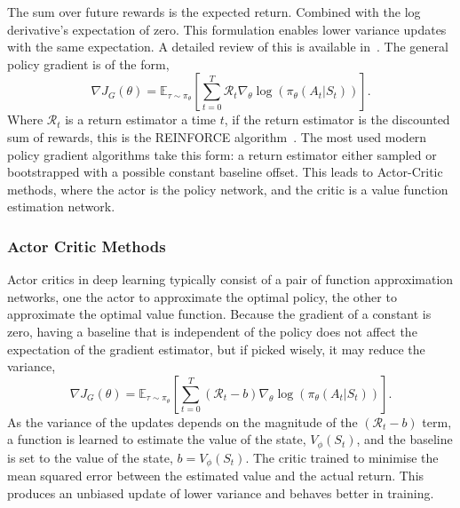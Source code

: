 The sum over future rewards is the expected return. Combined with the log derivative's expectation of zero. This formulation enables lower variance updates with the same expectation. A detailed review of this is available in~\cite{schulman2015highdimensional}. The general policy gradient is of the form,
\begin{equation}
	\nabla J_G(\theta)  = \mathbb{E}_{\tau \sim \pi_\theta} \left[\sum_{t=0} ^ T \mathcal{R}_t \nabla_\theta \log(\pi_\theta(A_t|S_t))\right].
\end{equation}
Where $\mathcal{R}_t$ is a return estimator a time $t$, if the return estimator is the discounted sum of rewards, this is the REINFORCE algorithm~\cite{williams1992simple}.
The most used modern policy gradient algorithms take this form: a return estimator either sampled or bootstrapped with a possible constant baseline offset. This leads to Actor-Critic methods, where the actor is the policy network, and the critic is a value function estimation network.

\subsubsection{Actor Critic Methods}
Actor critics in deep learning typically consist of a pair of function approximation networks, one the actor to approximate the optimal policy, the other to approximate the optimal value function. Because the gradient of a constant is zero, having a baseline that is independent of the policy does not affect the expectation of the gradient estimator, but if picked wisely, it may reduce the variance,
\begin{equation}
	\nabla J_G(\theta)  = \mathbb{E}_{\tau \sim \pi_\theta} \left[\sum_{t=0} ^ T (\mathcal{R}_t - b) \nabla_\theta \log(\pi_\theta(A_t|S_t))\right].
\end{equation}
As the variance of the updates depends on the magnitude of the $(\mathcal{R}_t - b)$ term, a function is learned to estimate the value of the state, $V_\phi(S_t)$, and the baseline is set to the value of the state, $b = V_\phi(S_t)$. The critic trained to minimise the mean squared error between the estimated value and the actual return. This produces an unbiased update of lower variance and behaves better in training.

